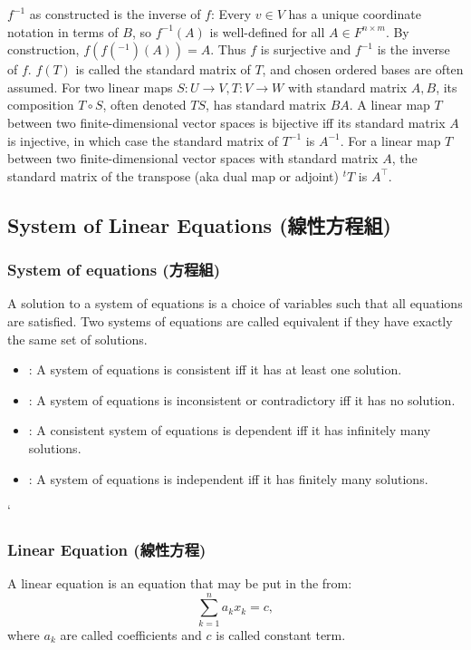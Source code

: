 \documentclass[a4paper,12pt]{report}
\begin{document}
$f^{-1}$ as constructed is the inverse of $f$: Every $v\in V$ has a unique coordinate notation in terms of $B$, so $f^{-1}(A)$ is well-defined for all $A\in F^{n\times m}$. By construction, $f(f(^{-1})(A))=A$. Thus $f$ is surjective and $f^{-1}$ is the inverse of $f$.
\epr
$f(T)$ is called the standard matrix of $T$, and chosen ordered bases are often assumed.
For two linear maps $S\colon U\to V,T\colon V\to W$ with standard matrix $A,B$, its composition $T\circ S$, often denoted $TS$, has standard matrix $BA$.
A linear map $T$ between two finite-dimensional vector spaces is bijective iff its standard matrix $A$ is injective, in which case the standard matrix of $T^{-1}$ is $A^{-1}$.
For a linear map $T$ between two finite-dimensional vector spaces with standard matrix $A$, the standard matrix of the transpose (aka dual map or adjoint) $^tT$ is $A^{\top}$.
\subsection{System of Linear Equations (線性方程組)}
\subsubsection{System of equations (方程組)}
A solution to a system of equations is a choice of variables such that all equations are satisfied. Two systems of equations are called equivalent if they have exactly the same set of solutions.
\begin{itemize}
\item{}: A system of equations is consistent iff it has at least one solution.
\item{}: A system of equations is inconsistent or contradictory iff it has no solution.
\item{}: A consistent system of equations is dependent iff it has infinitely many solutions.
\item{}: A system of equations is independent iff it has finitely many solutions.
\end{itemize}`
\subsubsection{Linear Equation (線性方程)}
A linear equation is an equation that may be put in the from:
\[\sum_{k=1}^na_kx_k=c,\]
where $a_k$ are called coefficients and $c$ is called constant term.
\end{document}
